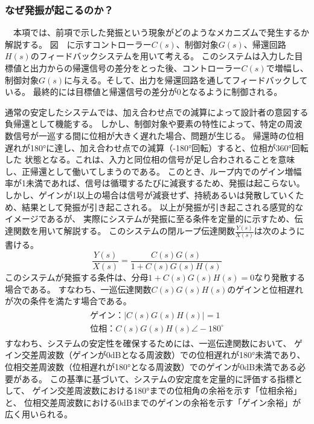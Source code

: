 \documentclass{ltjsarticle}
\begin{document}

\subsubsection{なぜ発振が起こるのか？}
　本項では、前項で示した発振という現象がどのようなメカニズムで発生するか解説する。
図　に示すコントローラー$C(s)$、制御対象$G(s)$、帰還回路$H(s)$のフィードバックシステムを用いて考える。
このシステムは入力した目標値と出力からの帰還信号の差分をとった後、コントローラー$C(s)$で増幅し、制御対象$G(s)$に与える。そして、出力を帰還回路を通してフィードバックしている。
最終的には目標値と帰還信号の差分が0となるように制御される。

通常の安定したシステムでは、加え合わせ点での減算によって設計者の意図する負帰還として機能する。
しかし、制御対象や要素の特性によって、特定の周波数信号が一巡する間に位相が大きく遅れた場合、問題が生じる。
帰還時の位相遅れが180°に達し、加え合わせ点での減算（-180°回転）すると、位相が360°回転した
状態となる。これは、入力と同位相の信号が足し合わされることを意味し、正帰還として働いてしまうのである。
このとき、ループ内でのゲイン増幅率が1未満であれば、信号は循環するたびに減衰するため、発振は起こらない。
しかし、ゲインが1以上の場合は信号が減衰せず、持続あるいは発散していくため、結果として発振が引き起こされる。
以上が発振が引き起こされる感覚的なイメージであるが、
実際にシステムが発振に至る条件を定量的に示すため、伝達関数を用いて解説する。
このシステムの閉ループ伝達関数$\frac{Y(s)}{X(s)}$は次のように書ける。
\begin{equation}
    \frac{Y(s)}{X(s)} = \frac{C(s)G(s)}{1+C(s)G(s)H(s)}
\end{equation}
このシステムが発振する条件は、分母$1+C(s)G(s)H(s) = 0$なり発散する場合である。
すなわち、一巡伝達関数$C(s)G(s)H(s)$のゲインと位相遅れが次の条件を満たす場合である。
\begin{gather*}
    \begin{aligned}
    ゲイン：\left|C(s)G(s)H(s)\right| = 1 \\
    位相：C(s)G(s)H(s) \angle -180^\circ        
    \end{aligned}
\end{gather*}
すなわち、システムの安定性を確保するためには、一巡伝達関数において、
ゲイン交差周波数（ゲインが0dBとなる周波数）での位相遅れが180°未満であり、
位相交差周波数（位相遅れが180°となる周波数）でのゲインが0dB未満である必要がある。
この基準に基づいて、システムの安定度を定量的に評価する指標として、
ゲイン交差周波数における180°までの位相角の余裕を示す「位相余裕」と、
位相交差周波数における0dBまでのゲインの余裕を示す「ゲイン余裕」が広く用いられる。
\end{document}

